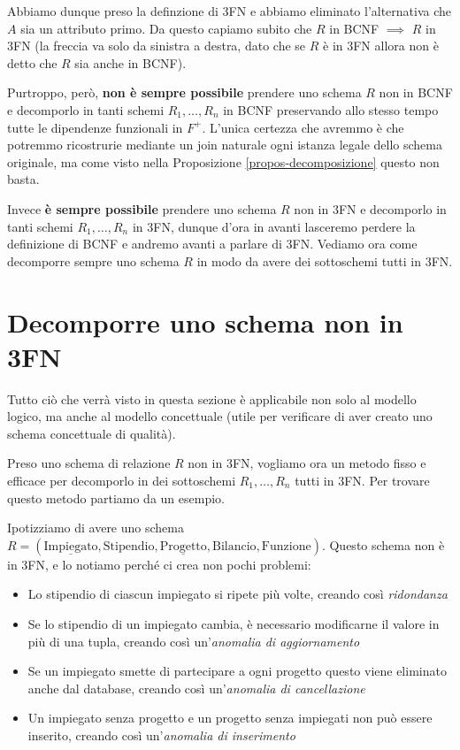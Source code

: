 \documentclass[11pt, a4paper, titlepage, oneside]{scrbook}
\begin{document}
Abbiamo dunque preso la definzione di 3FN e abbiamo eliminato l'alternativa che $A$ sia un attributo primo. Da questo capiamo subito che $R$ in BCNF $\implies$ $R$ in 3FN (la freccia va solo da sinistra a destra, dato che se $R$ è in 3FN allora non è detto che $R$ sia anche in BCNF).

Purtroppo, però, \textbf{non è sempre possibile} prendere uno schema $R$ non in BCNF e decomporlo in tanti schemi $R_1, \ldots, R_n$ in BCNF preservando allo stesso tempo tutte le dipendenze funzionali in $F^+$. L'unica certezza che avremmo è che potremmo ricostrurie mediante un join naturale ogni istanza legale dello schema originale, ma come visto nella Proposizione \ref{propos-decomposizione} questo non basta. 

Invece \textbf{è sempre possibile} prendere uno schema $R$ non in 3FN e decomporlo in tanti schemi $R_1, \ldots, R_n$ in 3FN, dunque d'ora in avanti lasceremo perdere la definizione di BCNF e andremo avanti a parlare di 3FN. Vediamo ora come decomporre sempre uno schema $R$ in modo da avere dei sottoschemi tutti in 3FN.

\section{Decomporre uno schema non in 3FN}

\NB Tutto ciò che verrà visto in questa sezione è applicabile non solo al modello logico, ma anche al modello concettuale (utile per verificare di aver creato uno schema concettuale di qualità).

Preso uno schema di relazione $R$ non in 3FN, vogliamo ora un metodo fisso e efficace per decomporlo in dei sottoschemi $R_1, \ldots, R_n$ tutti in 3FN. Per trovare questo metodo partiamo da un esempio. 

Ipotizziamo di avere uno schema $R = (\underline{\text{Impiegato}}, \text{Stipendio}, \underline{\text{Progetto}}, \text{Bilancio}, \text{Funzione})$. Questo schema non è in 3FN, e lo notiamo perché ci crea non pochi problemi:
\begin{itemize}
    \item Lo stipendio di ciascun impiegato si ripete più volte, creando così \textit{ridondanza}
    \item Se lo stipendio di un impiegato cambia, è necessario modificarne il valore in più di una tupla, creando così un'\textit{anomalia di aggiornamento}
    \item Se un impiegato smette di partecipare a ogni progetto questo viene eliminato anche dal database, creando così un'\textit{anomalia di cancellazione}
    \item Un impiegato senza progetto e un progetto senza impiegati non può essere inserito, creando così un'\textit{anomalia di inserimento}
\end{itemize} 
\end{document}
